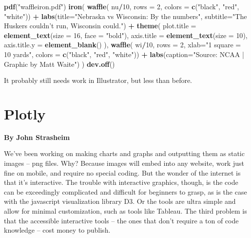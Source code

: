 \documentclass[
]{book}
\newenvironment{Shaded}{\begin{snugshade}}{\end{snugshade}}
\newcommand{\DataTypeTok}[1]{\textcolor[rgb]{0.13,0.29,0.53}{#1}}
\newcommand{\DecValTok}[1]{\textcolor[rgb]{0.00,0.00,0.81}{#1}}
\newcommand{\KeywordTok}[1]{\textcolor[rgb]{0.13,0.29,0.53}{\textbf{#1}}}
\newcommand{\NormalTok}[1]{#1}
\newcommand{\OperatorTok}[1]{\textcolor[rgb]{0.81,0.36,0.00}{\textbf{#1}}}
\newcommand{\StringTok}[1]{\textcolor[rgb]{0.31,0.60,0.02}{#1}}
\begin{document}
\begin{Shaded}
\begin{Highlighting}[]
\KeywordTok{pdf}\NormalTok{(}\StringTok{"waffleiron.pdf"}\NormalTok{)}
\KeywordTok{iron}\NormalTok{(}
 \KeywordTok{waffle}\NormalTok{(}
\NormalTok{   nu}\OperatorTok{/}\DecValTok{10}\NormalTok{, }
   \DataTypeTok{rows =} \DecValTok{2}\NormalTok{, }
   \DataTypeTok{colors =} \KeywordTok{c}\NormalTok{(}\StringTok{"black"}\NormalTok{, }\StringTok{"red"}\NormalTok{, }\StringTok{"white"}\NormalTok{)) }\OperatorTok{+}\StringTok{ }
\StringTok{   }\KeywordTok{labs}\NormalTok{(}\DataTypeTok{title=}\StringTok{"Nebraska vs Wisconsin: By the numbers"}\NormalTok{, }\DataTypeTok{subtitle=}\StringTok{"The Huskers couldn't run, Wisconsin could."}\NormalTok{) }\OperatorTok{+}\StringTok{ }
\StringTok{   }\KeywordTok{theme}\NormalTok{(}
    \DataTypeTok{plot.title =} \KeywordTok{element_text}\NormalTok{(}\DataTypeTok{size =} \DecValTok{16}\NormalTok{, }\DataTypeTok{face =} \StringTok{"bold"}\NormalTok{),}
    \DataTypeTok{axis.title =} \KeywordTok{element_text}\NormalTok{(}\DataTypeTok{size =} \DecValTok{10}\NormalTok{),}
    \DataTypeTok{axis.title.y =} \KeywordTok{element_blank}\NormalTok{()}
\NormalTok{  ),}
 \KeywordTok{waffle}\NormalTok{(}
\NormalTok{   wi}\OperatorTok{/}\DecValTok{10}\NormalTok{, }
   \DataTypeTok{rows =} \DecValTok{2}\NormalTok{, }
   \DataTypeTok{xlab=}\StringTok{"1 square = 10 yards"}\NormalTok{, }
   \DataTypeTok{colors =} \KeywordTok{c}\NormalTok{(}\StringTok{"black"}\NormalTok{, }\StringTok{"red"}\NormalTok{, }\StringTok{"white"}\NormalTok{)) }\OperatorTok{+}\StringTok{ }\KeywordTok{labs}\NormalTok{(}\DataTypeTok{caption=}\StringTok{"Source: NCAA | Graphic by Matt Waite"}\NormalTok{)}
\NormalTok{) }
\KeywordTok{dev.off}\NormalTok{()}
\end{Highlighting}
\end{Shaded}

It probably still needs work in Illustrator, but less than before.

\hypertarget{plotly}{%
\chapter{Plotly}\label{plotly}}

\textbf{By John Strasheim}

We've been working on making charts and graphs and outputting them as static images -- png files. Why? Because images will embed into any website, work just fine on mobile, and require no special coding. But the wonder of the internet is that it's interactive. The trouble with interactive graphics, though, is the code can be exceedingly complicated and difficult for beginners to grasp, as is the case with the javascript visualization library D3. Or the tools are ultra simple and allow for minimal customization, such as tools like Tableau. The third problem is that the accessible interactive tools -- the ones that don't require a ton of code knowledge -- cost money to publish.
\end{document}
